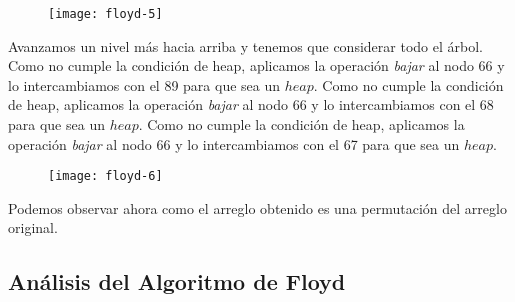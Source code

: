 \documentclass[10pt,a4paper]{article}
\begin{document}
\newline
\begin{figure}[h]
	\centering
\texttt{[image: floyd-5]}
	\label{drivers1}
\end{figure}
\newpage
Avanzamos un nivel más hacia arriba y tenemos que considerar todo el árbol. Como no cumple la condición de heap, aplicamos la operación \textit{bajar} al nodo 66 y lo intercambiamos con el 89 para que sea un $heap$. Como no cumple la condición de heap, aplicamos la operación \textit{bajar} al nodo 66 y lo intercambiamos con el 68 para que sea un $heap$. Como no cumple la condición de heap, aplicamos la operación \textit{bajar} al nodo 66 y lo intercambiamos con el 67 para que sea un $heap$.
\newline
\begin{figure}[h]
	\centering
\texttt{[image: floyd-6]}
	\label{drivers1}
\end{figure}
\newline
\newline
Podemos observar ahora como el arreglo obtenido es una permutación del arreglo original.

\subsection{Análisis del Algoritmo de Floyd}
\end{document}
